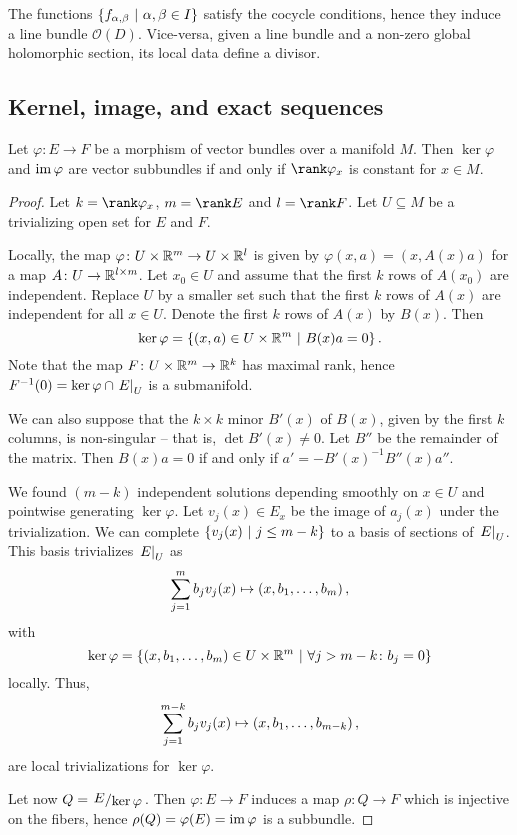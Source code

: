 \begin{opomba}
The functions $\left\{f_{\alpha, \beta}~\middle\vert~\alpha, \beta \in I\right\}$
satisfy the cocycle conditions, hence they induce a line bundle
$\mathcal{O}(D)$. Vice-versa, given a line bundle and a non-zero
global holomorphic section, its local data define a divisor.
\end{opomba}


\newpage

\subsection{Kernel, image, and exact sequences}


\begin{trditev}
Let $\varphi \colon E \to F$ be a morphism of vector bundles over a
manifold $M$. Then $\ker \varphi$ and $\operatorname{im} \varphi$ are vector
subbundles if and only if $\rank \varphi_x$ is constant for
$x \in M$.
\end{trditev}

\begin{proof}
Let $k = \rank \varphi_x$, $m = \rank E$ and $l = \rank F$. Let
$U \subseteq M$ be a trivializing open set for $E$ and $F$.

Locally, the map $\varphi \colon U \times \mathbb{R}^m \to U \times \mathbb{R}^l$
is given by $\varphi(x, a) = (x, A(x) a)$ for a map
$A \colon U \to \mathbb{R}^{l \times m}$. Let $x_0 \in U$ and assume that
the first $k$ rows of $A(x_0)$ are independent. Replace $U$ by a
smaller set such that the first $k$ rows of $A(x)$ are independent
for all $x \in U$. Denote the first $k$ rows of $A(x)$ by $B(x)$.
Then
\[
\ker \varphi = \left\{(x, a) \in U \times \mathbb{R}^m~\middle\vert~B(x) a = 0\right\}.
\]
Note that the map $F \colon U \times \mathbb{R}^m \to \mathbb{R}^k$ has maximal
rank, hence $F^{-1}(0) = \ker \varphi \cap \left. E\right|_{U}^{}$ is a
submanifold.

We can also suppose that the $k \times k$ minor $B'(x)$ of $B(x)$,
given by the first $k$ columns, is non-singular -- that is,
$\det B'(x) \ne 0$. Let $B''$ be the remainder of the matrix. Then
$B(x) a = 0$ if and only if $a' = -B'(x)^{-1} B''(x) a''$.

We found $(m-k)$ independent solutions depending smoothly on
$x \in U$ and pointwise generating $\ker \varphi$. Let
$v_j(x) \in E_x$ be the image of $a_j(x)$ under the trivialization.
We can complete $\left\{v_j(x)~\middle\vert~j \leq m-k\right\}$ to a basis of sections
of $\left. E\right|_{U}^{}$. This basis trivializes $\left. E\right|_{U}^{}$ as
\[
\sum_{j=1}^m b_j v_j(x) \mapsto \left(x, b_1, \dots, b_m\right),
\]
with
\[
\ker \varphi =
\left\{(x, b_1, \dots, b_m) \in U \times \mathbb{R}^m~\middle\vert~\forall j > m-k \colon b_j = 0\right\}
\]
locally. Thus,
\[
\sum_{j=1}^{m-k} b_j v_j(x) \mapsto \left(x, b_1, \dots, b_{m-k}\right),
\]
are local trivializations for $\ker \varphi$.

Let now $Q = \kvoc{E}{\ker \varphi}$. Then $\varphi \colon E \to F$
induces a map $\rho \colon Q \to F$ which is injective on the
fibers, hence $\rho(Q) = \varphi(E) = \operatorname{im} \varphi$ is a subbundle.
\end{proof}


